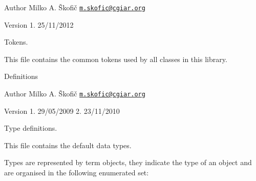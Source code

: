 \begin{DoxyAuthor}{Author}
Milko A. Škofič \href{mailto:m.skofic@cgiar.org}{\tt m.\-skofic@cgiar.\-org} 
\end{DoxyAuthor}
\begin{DoxyVersion}{Version}
1. 25/11/2012
\end{DoxyVersion}
Tokens.

This file contains the common tokens used by all classes in this library.

Definitions

\begin{DoxyAuthor}{Author}
Milko A. Škofič \href{mailto:m.skofic@cgiar.org}{\tt m.\-skofic@cgiar.\-org} 
\end{DoxyAuthor}
\begin{DoxyVersion}{Version}
1. 29/05/2009 2. 23/11/2010
\end{DoxyVersion}
Type definitions.

This file contains the default data types.

Types are represented by term objects, they indicate the type of an object and are organised in the following enumerated set\-:


